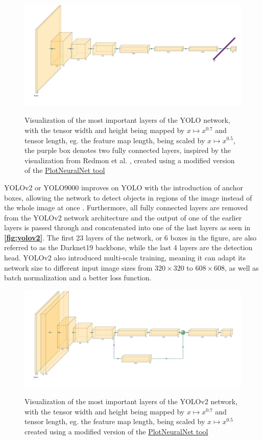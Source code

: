 \documentclass[10pt]{book}
\newcommand{\figureref}[1]{\textbf{\autoref{#1}}}
\begin{document}
\begin{figure}
  \caption{Visualization of the most important layers of the \ac{YOLO} network, with the tensor width and height being mapped by $x \mapsto x^{0.7}$ and tensor length, eg. the feature map length, being scaled by $x \mapsto x^{0.5}$, the purple box denotes two fully connected layers, inspired by the visualization from Redmon et al. \cite{redmon2016you}, created using a modified version of the \href{https://github.com/jnccd/PlotNeuralNet}{PlotNeuralNet tool} \cite{haris_iqbal_2018_2526396}}
  \includegraphics[width=\textwidth]{image/yolo}
  \label{fig:yolo}
\end{figure}

\ac{YOLO}v2 or \ac{YOLO}9000 improves on \ac{YOLO} with the introduction of anchor boxes, allowing the network to detect objects in regions of the image instead of the whole image at once \cite{redmon2017yolo9000}. Furthermore, all fully connected layers are removed from the \ac{YOLO}v2 network architecture and the output of one of the earlier layers is passed through and concatenated into one of the last layers as seen in \figureref{fig:yolov2}. The first 23 layers of the network, or 6 boxes in the figure, are also referred to as the Darknet19 backbone, while the last 4 layers are the detection head. \ac{YOLO}v2 also introduced multi-scale training, meaning it can adapt its network size to different input image sizes from $320 \times 320$ to $608 \times 608$, as well as batch normalization and a better loss function.

\begin{figure}
  \caption{Visualization of the most important layers of the \ac{YOLO}v2 network, with the tensor width and height being mapped by $x \mapsto x^{0.7}$ and tensor length, eg. the feature map length, being scaled by $x \mapsto x^{0.5}$ created using a modified version of the \href{https://github.com/jnccd/PlotNeuralNet}{PlotNeuralNet tool} \cite{haris_iqbal_2018_2526396}}
  \includegraphics[width=\textwidth]{image/yolov2}
  \label{fig:yolov2}
\end{figure}
\end{document}
